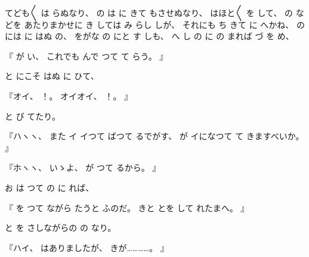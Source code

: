 
てども〳〵
は
らぬなり、
%
の
は
に
きて
もさせぬなり、
%
はほと〳〵
を
して、
%
の
などを
あたりまかせに
き
しては
み
らし
しが、
%
それにも
ち
きて
に
へかね、
%
の
には
に
はぬ
の、
%
をがな
の
にと
す%
しも、
%
へ
し
の
に
の
まれば
づ
を
め、

『
が
い、
%
これでも
んで
つて
て
らう。
』

と
にこそ
はぬ
に
ひて、

『オイ、
%
！。
%
オイオイ、
%
！。
』

と
び
てたり。

『ハヽヽ、
%
また
イ
イつて
ばつて
るでがす、
%
が
イになつて
て
きますべいか。
』

『ホヽヽ、
%
いゝよ、
%
が
つて
るから。
』

お
は
つて
の
に
れば、

『
を
つて
ながら
たうと
ふのだ。
%
きと
とを
して
れたまへ。
』

と
を
さしながらの
の
なり。

『ハイ、
%
はありましたが、
%
きが…………。
』

